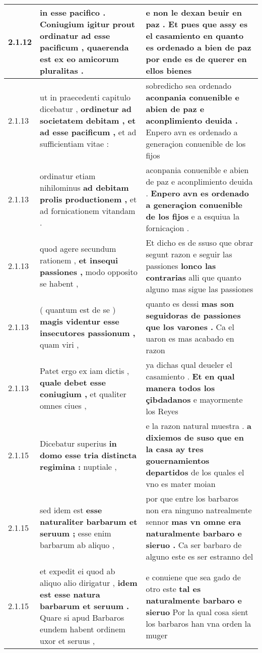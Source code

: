 \begin{tabular}{|p{1cm}|p{6.5cm}|p{6.5cm}|}
2.1.12 & in esse pacifico . \textbf{ Coniugium igitur prout ordinatur ad esse pacificum , } quaerenda est ex eo amicorum pluralitas . & e non le dexan beuir en paz . \textbf{ Et pues que assy es el casamiento en quanto es ordenado a bien de paz } por ende es de querer en ellos bienes \\\hline
2.1.13 & ut in praecedenti capitulo dicebatur , \textbf{ ordinetur ad societatem debitam , et ad esse pacificum , } et ad sufficientiam vitae : & sobredicho sea ordenado \textbf{ aconpania conuenible e abien de paz e aconplimiento deuida . } Enpero avn es ordenado a generaçion conuenible de los fijos \\\hline
2.1.13 & ordinatur etiam nihilominus \textbf{ ad debitam prolis productionem , } et ad fornicationem vitandam . & aconpania conuenible e abien de paz e aconplimiento deuida . \textbf{ Enpero avn es ordenado a generaçion conuenible de los fijos } e a esquiua la fornicaçion . \\\hline
2.1.13 & quod agere secundum rationem , \textbf{ et insequi passiones , } modo opposito se habent , & Et dicho es de ssuso que obrar segunt razon e seguir las passiones \textbf{ lonco las contrarias } alli que quanto alguno mas sigue las passiones \\\hline
2.1.13 & ( quantum est de se ) \textbf{ magis videntur esse insecutores passionum , } quam viri , & quanto es dessi \textbf{ mas son seguidoras de passiones que los varones . } Ca el uaron es mas acabado en razon \\\hline
2.1.13 & Patet ergo ex iam dictis , \textbf{ quale debet esse coniugium , } et qualiter omnes ciues , & ya dichas qual deueler el casamiento . \textbf{ Et en qual manera todos los çibdadanos } e mayormente los Reyes \\\hline
2.1.15 & Dicebatur superius \textbf{ in domo esse tria distincta regimina : } nuptiale , & e la razon natural muestra . \textbf{ a dixiemos de suso que en la casa ay tres gouernamientos departidos } de los quales el vno es mater moian \\\hline
2.1.15 & sed idem est \textbf{ esse naturaliter barbarum et seruum ; } esse enim barbarum ab aliquo , & por que entre los barbaros non era ninguno natrealmente sennor \textbf{ mas vn omne era naturalmente barbaro e sieruo . } Ca ser barbaro de alguno este es ser estranno del \\\hline
2.1.15 & et expedit ei quod ab aliquo alio dirigatur , \textbf{ idem est esse natura barbarum et seruum . } Quare si apud Barbaros eundem habent ordinem uxor et seruus , & e conuiene que sea gado de otro este \textbf{ tal es naturalmente barbaro e sieruo } Por la qual cosa sient los barbaros han vna orden la muger \\\hline

\end{tabular}
